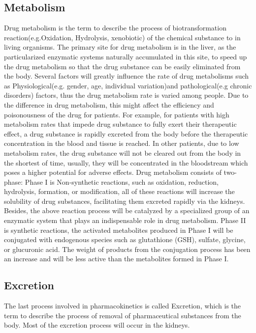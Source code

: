 \documentclass[12pt]{article}
\begin{document}
\subsection{Metabolism}
Drug metabolism is the term to describe the process of biotransformation reaction(e.g.Oxidation, Hydrolysis, xenobiotic) of the chemical substance to in living organisms. The primary site for drug metabolism is in the liver, as the particularized enzymatic systems naturally accumulated in this site, to speed up the drug metabolism so that the drug substance can be easily eliminated from the body. Several factors will greatly influence the rate of drug metabolisms such as Physiological(e.g. gender, age, individual variation)and pathological(e.g chronic disorders) factors, thus the drug metabolism rate is varied among people. Due to the difference in drug metabolism, this might affect the efficiency and poisonousness of the drug for patients. For example, for patients with high metabolism rates that impede drug substance to fully exert their therapeutic effect, a drug substance is rapidly excreted from the body before the therapeutic concentration in the blood and tissue is reached. In other patients, due to low metabolism rates, the drug substance will not be cleared out from the body in the shortest of time, usually, they will be concentrated in the bloodstream which poses a higher potential for adverse effects. Drug metabolism consists of two-phase: Phase I is Non-synthetic reactions, such as oxidation, reduction, hydrolysis, formation, or modification, all of these reactions will increase the solubility of drug substances, facilitating them excreted rapidly via the kidneys. Besides, the above reaction process will be catalyzed by a specialized group of an enzymatic system that plays an indispensable role in drug metabolism. Phase II is synthetic reactions, the activated metabolites produced in Phase I will be conjugated with endogenous species such as glutathione (GSH), sulfate, glycine, or glucuronic acid. The weight of products from the conjugation process has been an increase and will be less active than the metabolites formed in Phase I.
\subsection{Excretion}
The last process involved in pharmacokinetics is called Excretion, which is the term to describe the process of removal of pharmaceutical substances from the body. Most of the excretion process will occur in the kidneys.
\end{document}
